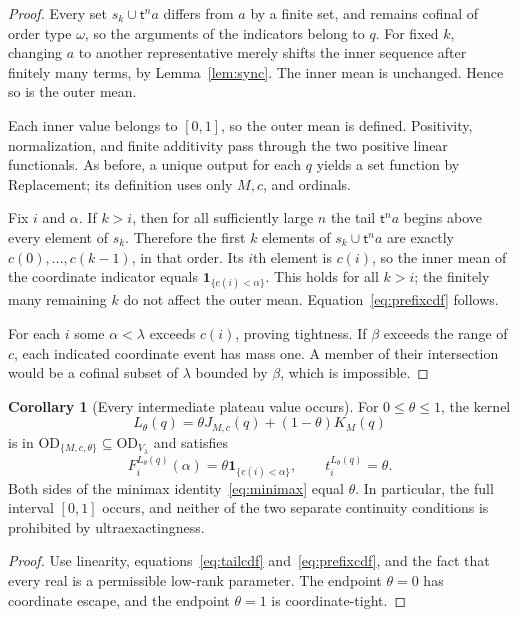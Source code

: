\documentclass[11pt,letterpaper]{article}
\theoremstyle{definition}
\newtheorem{corollary}[definition]{Corollary}
\newcommand{\OD}{\mathrm{OD}}
\newcommand{\ODlam}{\OD_{V_\lambda}}
\newcommand{\ind}{\mathbf 1}
\newcommand{\tail}{\mathsf t}
\begin{document}
\begin{proof}
Every set $s_k\cup\tail^n a$ differs from $a$ by a finite set, and remains cofinal of order type $\omega$, so the arguments of the indicators belong to $q$. For fixed $k$, changing $a$ to another representative merely shifts the inner sequence after finitely many terms, by Lemma~\ref{lem:sync}. The inner mean is unchanged. Hence so is the outer mean.

Each inner value belongs to $[0,1]$, so the outer mean is defined. Positivity, normalization, and finite additivity pass through the two positive linear functionals. As before, a unique output for each $q$ yields a set function by Replacement; its definition uses only $M,c$, and ordinals.

Fix $i$ and $\alpha$. If $k>i$, then for all sufficiently large $n$ the tail $\tail^n a$ begins above every element of $s_k$. Therefore the first $k$ elements of $s_k\cup\tail^n a$ are exactly $c(0),\ldots,c(k-1)$, in that order. Its $i$th element is $c(i)$, so the inner mean of the coordinate indicator equals $\ind_{\{c(i)<\alpha\}}$. This holds for all $k>i$; the finitely many remaining $k$ do not affect the outer mean. Equation~\eqref{eq:prefixcdf} follows.

For each $i$ some $\alpha<\lambda$ exceeds $c(i)$, proving tightness. If $\beta$ exceeds the range of $c$, each indicated coordinate event has mass one. A member of their intersection would be a cofinal subset of $\lambda$ bounded by $\beta$, which is impossible.
\end{proof}

\begin{corollary}[Every intermediate plateau value occurs]\label{cor:sharp}
For $0\le\theta\le1$, the kernel
\[
 L_\theta(q)=\theta J_{M,c}(q)+(1-\theta)K_M(q)
\]
is in $\OD_{\{M,c,\theta\}}\subseteq\ODlam$ and satisfies
\[
 F_i^{L_\theta(q)}(\alpha)=\theta\ind_{\{c(i)<\alpha\}},
 \qquad t_i^{L_\theta(q)}=\theta.
\]
Both sides of the minimax identity~\eqref{eq:minimax} equal $\theta$. In particular, the full interval $[0,1]$ occurs, and neither of the two separate continuity conditions is prohibited by ultraexactingness.
\end{corollary}

\begin{proof}
Use linearity, equations~\eqref{eq:tailcdf} and~\eqref{eq:prefixcdf}, and the fact that every real is a permissible low-rank parameter. The endpoint $\theta=0$ has coordinate escape, and the endpoint $\theta=1$ is coordinate-tight.
\end{proof}
\end{document}
